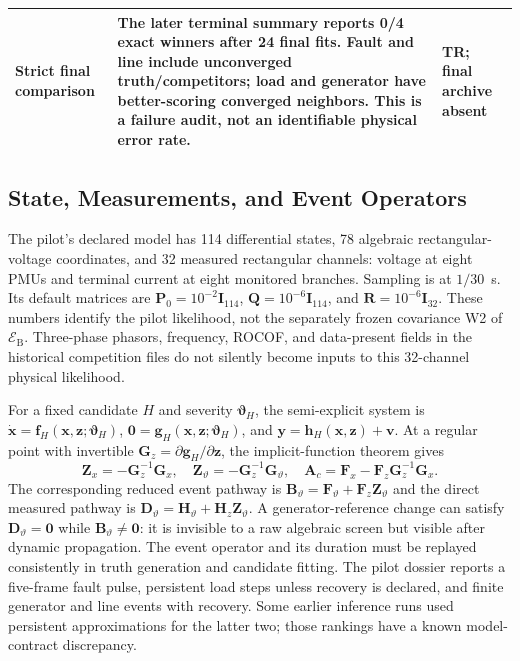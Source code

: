 \begin{table}[t]
\begin{tabularx}{\textwidth}{@{}p{2.6cm}Xp{2.15cm}@{}}
Strict final comparison & The later terminal summary reports 0/4 exact winners after 24 final fits. Fault and line include unconverged truth/competitors; load and generator have better-scoring converged neighbors. This is a failure audit, not an identifiable physical error rate. & TR; final archive absent \\
\bottomrule
\end{tabularx}
\end{table}

\subsection{State, Measurements, and Event Operators}

The pilot's declared model has 114 differential states, 78 algebraic rectangular-voltage coordinates, and 32 measured rectangular channels: voltage at eight PMUs and terminal current at eight monitored branches. Sampling is at $1/30$~s. Its default matrices are $\bm P_0=10^{-2}\bm I_{114}$, $\bm Q=10^{-6}\bm I_{114}$, and $\bm R=10^{-6}\bm I_{32}$. These numbers identify the pilot likelihood, not the separately frozen covariance W2 of $\mathcal E_{\mathrm B}$. Three-phase phasors, frequency, ROCOF, and data-present fields in the historical competition files do not silently become inputs to this 32-channel physical likelihood.

For a fixed candidate $H$ and severity $\bm\vartheta_H$, the semi-explicit system is $\dot{\bm x}=\bm f_H(\bm x,\bm z;\bm\vartheta_H)$, $\bm0=\bm g_H(\bm x,\bm z;\bm\vartheta_H)$, and $\bm y=\bm h_H(\bm x,\bm z)+\bm v$. At a regular point with invertible $\bm G_z=\partial\bm g_H/\partial\bm z$, the implicit-function theorem gives
\begin{equation}
\bm Z_x=-\bm G_z^{-1}\bm G_x,\quad
\bm Z_{\vartheta}=-\bm G_z^{-1}\bm G_{\vartheta},\quad
\bm A_c=\bm F_x-\bm F_z\bm G_z^{-1}\bm G_x.
\label{eq:pilot-dae-reduction}
\end{equation}
The corresponding reduced event pathway is $\bm B_{\vartheta}=\bm F_{\vartheta}+\bm F_z\bm Z_{\vartheta}$ and the direct measured pathway is $\bm D_{\vartheta}=\bm H_{\vartheta}+\bm H_z\bm Z_{\vartheta}$. A generator-reference change can satisfy $\bm D_{\vartheta}=\bm0$ while $\bm B_{\vartheta}\ne\bm0$: it is invisible to a raw algebraic screen but visible after dynamic propagation. The event operator and its duration must be replayed consistently in truth generation and candidate fitting. The pilot dossier reports a five-frame fault pulse, persistent load steps unless recovery is declared, and finite generator and line events with recovery. Some earlier inference runs used persistent approximations for the latter two; those rankings have a known model-contract discrepancy.

